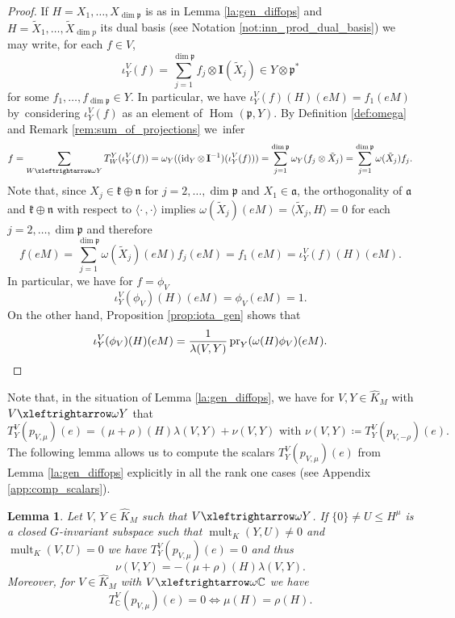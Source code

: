 \documentclass[JEP,XML,SOM,NoFloatCountersInSection,Unicode,published]{cedram}
\newtheorem{lemma}[theorem]{Lemma}
\theoremstyle{definition}
\newcommand{\lraomega}{\ensuremath{\xleftrightarrow\omega}}
\newcommand{\mf}[1]{\ensuremath{\mathfrak{#1}}}
\newcommand{\on}[1]{\ensuremath{\operatorname{#1}}}
\newcommand{\Hom}[3]{\ensuremath{\on{Hom}_{#1}(#2,#3)}}
\newcommand{\rhoa}{\ensuremath{\rho}}
\newcommand{\C}{\ensuremath{\mathbb{C}}}
\newcommand{\I}{\ensuremath{\mathbf{I}}}
\begin{document}
\begin{proof}
If $H=X_1,\ldots,X_{\dim\mf p}$ is as in Lemma \ref{la:gen_diffops} and $H=\tilde X_1,\ldots,\tilde X_{\dim p}$ its dual basis (see Notation \ref{not:inn_prod_dual_basis}) we may write, for each $f\in V$,\vspace*{-3pt}
\begin{equation}\label{eq:proof_base_decomp}
\iota_Y^V(f)=\sum_{j=1}^{\dim\mf p}f_j\otimes\I(\tilde X_j)\in Y\otimes\mf p^*
\end{equation}
for some $f_1,\ldots,f_{\dim\mf p}\in Y$.
In particular, we have $\iota_Y^V(f)(H)(eM)=f_1(eM)$ by~considering $\iota_Y^V(f)$ as an element of $\Hom{}{\mf p}{Y}$. By Definition \ref{def:omega} and Remark \ref{rem:sum_of_projections} we~infer\vspace*{-3pt}
\[
f=\sum_{W\lraomega Y}T_W^Y(\iota_Y^V(f))=\omega_Y((\on{id}_Y\otimes\,\I^{-1})(\iota_Y^V(f)))=\sum_{j=1}^{\dim\mf p}\omega_Y(f_j\otimes\tilde X_j)=\sum_{j=1}^{\dim\mf p}\omega(\tilde X_j)f_j.
\]
Note that, since $X_j\in\mf k\oplus\mf n$ for $j=2,\ldots,\dim\mf p$ and $X_1\in\mf a$, the orthogonality of $\mf a$ and $\mf k\oplus\mf n$ with respect to $\langle\cdot\,,\cdot\rangle$ implies
$\omega(\tilde X_j)(eM)=\langle\tilde X_j,H\rangle=0$ for each $j=2,\ldots,\dim\mf p$ and therefore\vspace*{-3pt}
\[
f(eM)=\sum_{j=1}^{\dim\mf p}\omega(\tilde X_j)(eM)f_j(eM)=f_1(eM)=\iota_Y^V(f)(H)(eM).
\]
In particular, we have for $f=\phi_V$\vspace*{-3pt}
\[
\iota_Y^V(\phi_V)(H)(eM)=\phi_V(eM)=1.
\]
On the other hand, Proposition \ref{prop:iota_gen} shows that\vspace*{-3pt}
\[
\iota_Y^V(\phi_V)(H)(eM)=\frac{1}{\lambda(V,Y)}\on{pr}_Y(\omega(H)\phi_V)(eM).\qedhere
\]
\end{proof}

Note that, in the situation of Lemma \ref{la:gen_diffops}, we have for $V,Y\in\hat K_M$ with $V\lraomega Y$ that\vspace*{-3pt}
\begin{equation}\label{eq:T_decomp}
T_Y^V(p_{V,\mu})(e)=(\mu+\rhoa)(H)\lambda(V,Y)+\nu(V,Y)\text{ with }\nu(V,Y)\coloneqq T_Y^V(p_{V,-\rhoa})(e).
\end{equation}
The following lemma allows us to compute the scalars $T_Y^V(p_{V,\mu})(e)$ from Lemma \ref{la:gen_diffops} explicitly in all the rank one cases (see Appendix \ref{app:comp_scalars}).

\begin{lemma}\label{la:nu_comp_series}
Let $V,\, Y\in\hat K_M$ such that $V\lraomega Y$. If $\{0\}\neq U\leq H^\mu$ is a closed $G$-invariant subspace such that $\on{mult}_K(Y,U)\neq 0$ and $\on{mult}_K(V,U)=0$ we have $T_Y^V(p_{V,\mu})(e)=0$ and thus
\[
\nu(V,Y)=-(\mu+\rhoa)(H)\lambda(V,Y).
\]
Moreover, for $V\in\hat K_M$ with $V\lraomega\C$ we have
\[
T_{\C}^V(p_{V,\mu})(e)=0\iff\mu(H)=\rhoa(H).
\]
\end{lemma}
\end{document}
